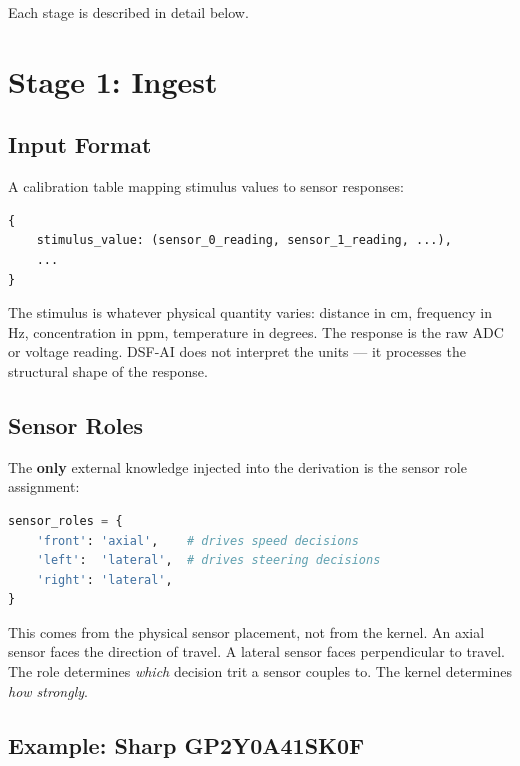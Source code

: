 \documentclass[11pt,a4paper]{article}
\begin{document}
Each stage is described in detail below.

\section{Stage 1: Ingest}

\subsection{Input Format}

A calibration table mapping stimulus values to sensor responses:

\begin{lstlisting}[language=Python]
{
    stimulus_value: (sensor_0_reading, sensor_1_reading, ...),
    ...
}
\end{lstlisting}

The stimulus is whatever physical quantity varies: distance in cm,
frequency in Hz, concentration in ppm, temperature in degrees. The
response is the raw ADC or voltage reading. DSF-AI does not interpret
the units --- it processes the structural shape of the response.

\subsection{Sensor Roles}

The \textbf{only} external knowledge injected into the derivation is
the sensor role assignment:

\begin{lstlisting}[language=Python]
sensor_roles = {
    'front': 'axial',    # drives speed decisions
    'left':  'lateral',  # drives steering decisions
    'right': 'lateral',
}
\end{lstlisting}

This comes from the physical sensor placement, not from the kernel.
An axial sensor faces the direction of travel. A lateral sensor faces
perpendicular to travel. The role determines \textit{which} decision
trit a sensor couples to. The kernel determines \textit{how strongly}.

\subsection{Example: Sharp GP2Y0A41SK0F}
\end{document}
